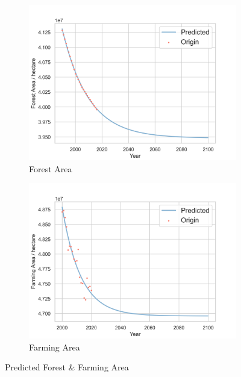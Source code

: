 \documentclass[12pt]{article}
\begin{document}
\begin{figure}[hbt]
    \centering
        \begin{subfigure}[]{0.4\textwidth}
            \includegraphics[width = \textwidth]{fig/projection/Forest_Area.png}
            \caption{Forest Area}
        \end{subfigure}
        \begin{subfigure}[]{0.4\textwidth}
            \includegraphics[width = \textwidth]{fig/projection/Farming_Area.png}
            \caption{Farming Area}
        \end{subfigure}
    \caption{Predicted Forest \& Farming Area}
\end{figure}
\end{document}
